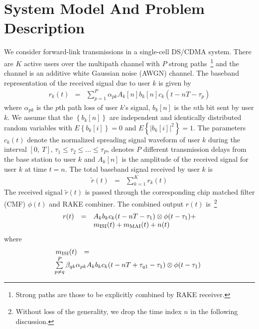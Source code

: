 \documentclass[a4paper,10pt,fleqn, twocolumn]{IEEETran}
\begin{document}
\section{System Model And Problem Description}
We consider forward-link transmissions in a single-cell DS/CDMA
system. There are $K$ active users over the multipath channel with
$P$ strong paths~\footnote{Strong paths are those to be explicitly
combined by RAKE receiver.} and the channel is an additive white
Gaussian noise (AWGN) channel. The baseband representation of the
received signal due to user $k$ is given by
\begin{equation}
\begin{array}{rcl}
r_k(t)&=&\sum\limits_{p=1}^{P}\alpha_{pk}A_k[n]
b_k[n]c_k(t-nT-\tau_p)
\end{array}
\end{equation}
\noindent where $\alpha_{pk}$ is the $p$th path loss of user $k$'s
signal, $b_k{[n]}$ is the $n$th bit sent by user $k$. We assume
that the $\left\{b_k{[n]}\right\}$ are independent and identically
distributed random variables with $E\left\{b_k{[i]}\right\}=0$ and
$E\left\{|b_k{[i]}|^2\right\}=1$. The parameters $c_k(t)$ denote
the normalized spreading signal waveform of user $k$ during the
interval $[0,\ T]$, $\tau_1\leq\tau_2\leq\ldots\leq\tau_P$,
denotes $P$ different transmission delays from the base station to
user $k$ and $A_k[n]$ is the amplitude of the received signal for
user $k$ at time $t=n$. The total baseband signal received by user
$k$ is
\begin{equation}
\begin{array}{rcl}
\tilde{r}(t)&=&\sum\limits_{k=1}^{K}r_k(t)
\end{array}
\end{equation}
The received signal $\tilde{r}(t)$ is passed through the
corresponding chip matched filter (CMF) $\phi(t)$ and RAKE
combiner. The combined output $r(t)$ is~\footnote{Without loss of
the generality, we drop the time index $n$ in the following
discussion.}
\begin{equation}\hspace{-0.0in}
\begin{array}{rcl}
r(t)&=&A_k b_k c_k(t-nT-\tau_1)\otimes \phi(t-\tau_1)+ \\
&&\hspace{0.0in} m_{\rm ISI}(t) + m_{\rm MAI}(t) + n(t)
\end{array}\label{r_t}
\end{equation}
\noindent where
\begin{equation} \hspace{-0.05in}
\begin{array}{rcl}
 m_{\rm ISI}(t)&=&\\
 &&\hspace{-0.83in}\sum\limits^{P}_{p\neq
q}\beta_{qk} \alpha_{pk}A_kb_kc_k(t-nT+\tau_{q1}-\tau_1)\otimes
\phi(t-\tau_1)
\end{array}
\end{equation}
\end{document}
